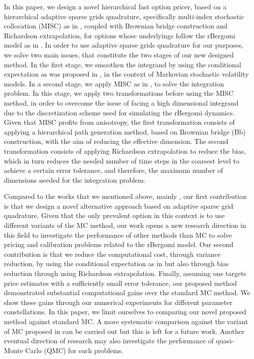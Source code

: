 In this paper,  we design a novel hierarchical fast option pricer,  based on a  hierarchical adaptive sparse grids quadrature, specifically  multi-index stochastic collocation (MISC) as in  \cite{haji2016multi}, coupled with Brownian bridge construction and Richardson extrapolation, for options whose underlyings  follow the rBergomi model as in \cite{bayer2016pricing}.  In order to use adaptive sparse grids quadrature for our purposes, we  solve two main issues, that constitute the two stages of our new designed method. In the first stage, we smoothen the integrand by using the conditional expectation as was proposed in \cite{romano1997contingent}, in the context of Markovian stochastic volatility  models.   In a second stage, we apply  MISC as in \cite{haji2016multi}, to solve the integration problem. In this stage, we apply two transformations before using the MISC method, in order to overcome the issue of facing a high dimensional integrand due to the discretization scheme used for simulating the rBergomi dynamics. Given that MISC profits from anisotropy, the first transformation consists of applying a hierarchical  path generation method, based on Brownian
bridge (Bb) construction, with the aim of reducing the effective dimension. The second transformation consists of applying Richardson extrapolation to reduce the bias, which in turn reduces the needed number of time steps in the coarsest level to achieve a certain error tolerance, and therefore,  the maximum number of dimensions needed for the integration problem.

Compared to the works that we mentioned above, mainly \cite{mccrickerd2017turbocharging}, our first contribution is that we design a novel alternative approach based on adaptive sparse grid quadrature. Given that the only prevalent option in this context is to use different variants of the MC method, our work opens a new  research direction in this field to investigate the performance of other methods than MC to solve pricing and calibration problems related to the rBergomi model. Our second contribution is that we reduce the computational cost, through variance reduction,  by using the conditional expectation as in \cite{mccrickerd2017turbocharging} but also through bias reduction through using Richardson extrapolation. Finally, assuming one targets price estimates with a sufficiently small  error tolerance, our proposed method demonstrated substantial computational gains  over the standard MC method. We show  these gains through our numerical experiments for  different parameter constellations. In this paper, we limit ourselves to comparing our novel proposed method against standard MC. A more systematic comparison against the variant of MC proposed in \cite{mccrickerd2017turbocharging}  can be carried out but this is left for a future work. Another eventual direction of research may also investigate the performance of quasi-Monte Carlo (QMC) for such problems.


